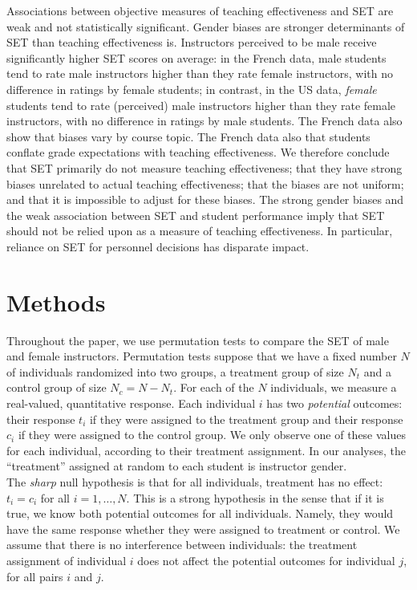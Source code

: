 \documentclass[12pt]{article}
\begin{document}
Associations between objective measures of teaching effectiveness and SET are weak
and not statistically significant.
Gender biases are stronger determinants of SET than teaching effectiveness is.
Instructors perceived to be male receive significantly higher SET scores on average:
in the French data, male students tend to rate male instructors higher
than they rate female instructors, with no difference in ratings by female students;
in contrast, in the US data, \emph{female} students tend to rate (perceived) male instructors 
higher than they rate female instructors, with no difference in ratings by male students. 
The French data also show that biases vary by course topic. 
The French data also that students conflate grade expectations with teaching effectiveness.
We therefore conclude that SET primarily do not measure teaching effectiveness; that
they have strong biases unrelated to actual teaching effectiveness; that the biases are not uniform;
and that it is impossible to adjust for these biases. 
The strong gender biases and the weak association between SET and student performance
imply that SET should not be relied upon as a measure of teaching effectiveness.
In particular, reliance on SET for personnel decisions has disparate impact. 

\section{Methods}
Throughout the paper, we use permutation tests to compare the SET of male and female instructors.  Permutation tests suppose that we have a fixed number $N$ of individuals randomized into two groups, a treatment group of size $N_t$ and a control group of size $N_c = N-N_t$.  For each of the $N$ individuals, we measure a real-valued, quantitative response.  Each individual $i$ has two \textit{potential} outcomes: their response $t_i$ if they were assigned to the treatment group and their response $c_i$ if they were assigned to the control group.  We only observe one of these values for each individual, according to their treatment assignment.  In our analyses, the ``treatment'' assigned at random to each student is instructor gender.  \\

The \textit{sharp} null hypothesis is that for all individuals, treatment has no effect: $t_i = c_i$ for all $i = 1,\dots,N$.  This is a strong hypothesis in the sense that if it is true, we know both potential outcomes for all individuals.  Namely, they would have the same response whether they were assigned to treatment or control.  We assume that there is no interference between individuals: the treatment assignment of individual $i$ does not affect the potential outcomes for individual $j$, for all pairs $i$ and $j$. \\
\end{document}
